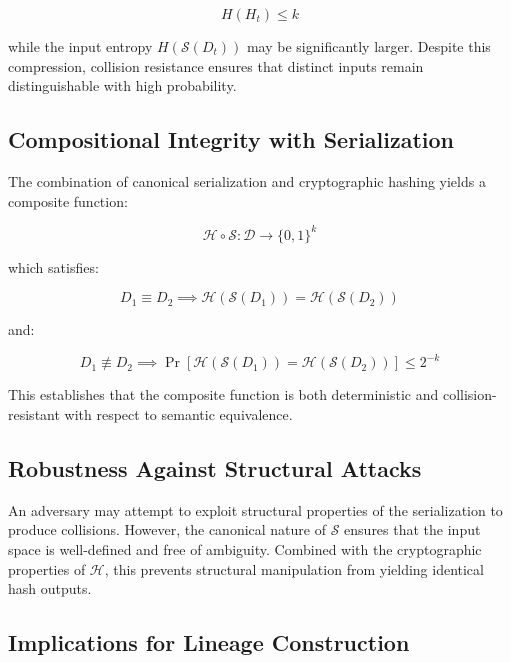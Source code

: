 \begin{equation}
H(H_t) \leq k
\end{equation}

while the input entropy $H(\mathcal{S}(D_t))$ may be significantly larger. Despite this compression, collision resistance ensures that distinct inputs remain distinguishable with high probability.

\subsection{Compositional Integrity with Serialization}

The combination of canonical serialization and cryptographic hashing yields a composite function:

\begin{equation}
\mathcal{H} \circ \mathcal{S}: \mathcal{D} \rightarrow \{0,1\}^k
\end{equation}

which satisfies:

\begin{equation}
D_1 \equiv D_2 \implies \mathcal{H}(\mathcal{S}(D_1)) = \mathcal{H}(\mathcal{S}(D_2))
\end{equation}

and:

\begin{equation}
D_1 \not\equiv D_2 \implies \Pr[\mathcal{H}(\mathcal{S}(D_1)) = \mathcal{H}(\mathcal{S}(D_2))] \leq 2^{-k}
\end{equation}

This establishes that the composite function is both deterministic and collision-resistant with respect to semantic equivalence.

\subsection{Robustness Against Structural Attacks}

An adversary may attempt to exploit structural properties of the serialization to produce collisions. However, the canonical nature of $\mathcal{S}$ ensures that the input space is well-defined and free of ambiguity. Combined with the cryptographic properties of $\mathcal{H}$, this prevents structural manipulation from yielding identical hash outputs.

\subsection{Implications for Lineage Construction}

